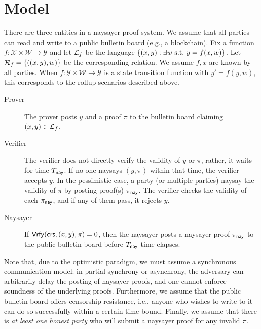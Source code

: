 \section{Model}\label{sec:naysayer_model}

There are three entities in a naysayer proof system. We assume that all parties can read and write to a public bulletin board (e.g., a blockchain). Fix a function $f: \mathcal{X} \times \mathcal{W} \to \mathcal{Y}$ and let $\mathcal{L}_f$ be the language $\{(x, y): \exists w \mathrm{~s.t.~} y = f(x, w)\}$. Let $\mathcal{R}_f = \{((x, y), w)\}$ be the corresponding relation. We assume $f,x$ are known by all parties. When $f : \mathcal{Y} \times \mathcal{W} \to \mathcal{Y}$ is a state transition function with $y' = f(y, w)$, this corresponds to the rollup scenarios described above.
\begin{description}
    \item[Prover] The prover posts $y$ and a proof $\pi$ to the bulletin board claiming $(x,y) \in \mathcal{L}_f$. 
    \item[Verifier] The verifier does not directly verify the validity of $y$ or $\pi$, rather, it waits for time $T_{\mathsf{nay}}$.
    If no one naysays $(y, \pi)$ within that time, the verifier accepts $y$. In the pessimistic case, a party (or multiple parties) naysay the validity of $\pi$ by posting proof(s) $\pi_{\mathsf{nay}}$. The verifier checks the validity of each $\pi_{\mathsf{nay}}$, and if any of them pass, it rejects $y$.
    \item[Naysayer] If $\mathsf{Vrfy}(\mathsf{crs}, (x,y),\pi)=0$, then the naysayer posts a naysayer proof $\pi_{\mathsf{nay}}$ to the public bulletin board before $T_{\mathsf{nay}}$ time elapses.
\end{description}

Note that, due to the optimistic paradigm, we must assume a synchronous communication model: in partial synchrony or asynchrony, the adversary can arbitrarily delay the posting of naysayer proofs, and one cannot enforce soundness of the underlying proofs. 
Furthermore, we assume that the public bulletin board offers censorship-resistance, i.e., anyone who wishes to write to it can do so successfully within a certain time bound. Finally, we assume that there is \emph{at least one honest party} who will submit a naysayer proof for any invalid $\pi$.